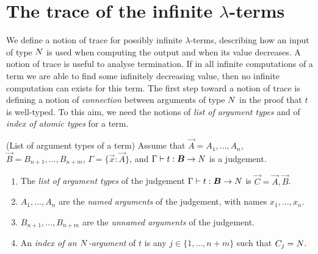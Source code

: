 \section{The trace of the infinite $\lambda$-terms}\label{section-trace-infinite-lambda-terms}

We define a notion of trace for possibly infinite $\lambda$-terms, 
describing how an input of type ${N}$ is used when computing the output
and when its value decreases. A notion of trace is useful to analyse termination.
If in all infinite computations of a term we are able to find some infinitely
decreasing value, then no infinite computation can exists for this term. 
The first step toward a notion of  trace is defining a notion of \emph{connection} 
between arguments of type ${N}$ in the proof that $t$ is well-typed. 
To this aim, we need the notions of \emph{list of argument
 types} and of \emph{index of atomic types} for a term.

%
%

\begin{definition}(List of argument types of a term)
Assume that $\vec{A} = A_1, \ldots, A_n$, 
$\vec{B}=B_{n+1}, \ldots, B_{n+m}$, 
$\Gamma = \{\vec{x}:\vec{A}\}$,
and $\Gamma \vdash t: \vec{B} \rightarrow \N$ is a judgement.

\begin{enumerate}
\item
The \emph{list of argument types} of the judgement
$\Gamma \vdash t: \vec{B} \rightarrow \N$ 
is $\vec{C} = \vec{A},\vec{B}$. 

\item
$A_1, \ldots, A_n$ are the \emph{named arguments} of the judgement, 
with names $x_1, \ldots, x_n$.

\item
$B_{n+1}, \ldots, B_{n+m}$ are the \emph{unnamed arguments} of the judgement.

\item
An \emph{index of an ${N}$-argument} 
of $t$ is any $j \in \{1, \ldots, n+m\}$ such that $C_j = {N}$.

\end{enumerate}
\end{definition}

